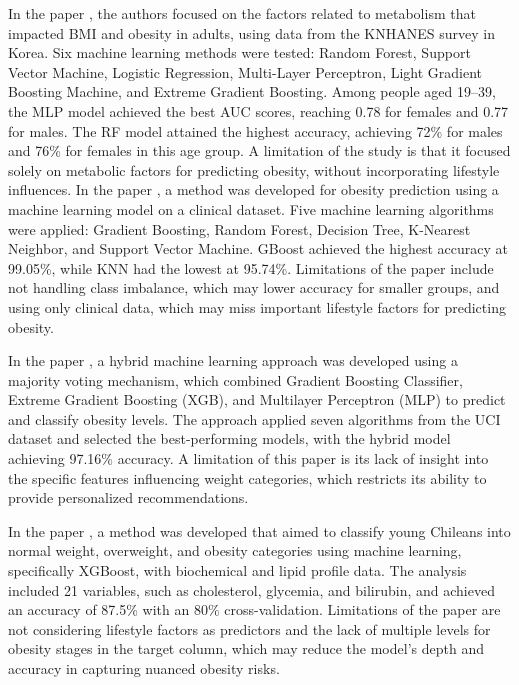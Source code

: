 In the paper \cite{Islam2022}, the authors focused on the factors related to metabolism that impacted BMI and obesity in adults, using data from the KNHANES survey in Korea. Six machine learning methods were tested: Random Forest, Support Vector Machine, Logistic Regression, Multi-Layer Perceptron, Light Gradient Boosting Machine, and Extreme Gradient Boosting. Among people aged 19–39, the MLP model achieved the best AUC scores, reaching 0.78 for females and 0.77 for males. The RF model attained the highest accuracy, achieving 72\% for males and 76\% for females in this age group. A limitation of the study is that it focused solely on metabolic factors for predicting obesity, without incorporating lifestyle influences. 
In the paper \cite{Sharma2023}, a method was developed for obesity prediction using a machine learning model on a clinical dataset. Five machine learning algorithms were applied: Gradient Boosting, Random Forest, Decision Tree, K-Nearest Neighbor, and Support Vector Machine. GBoost achieved the highest accuracy at 99.05\%, while KNN had the lowest at 95.74\%. Limitations of the paper include not handling class imbalance, which may lower accuracy for smaller groups, and using only clinical data, which may miss important lifestyle factors for predicting obesity. 

In the paper \cite{Raja2023}, a hybrid machine learning approach was developed using a majority voting mechanism, which combined Gradient Boosting Classifier, Extreme Gradient Boosting (XGB), and Multilayer Perceptron (MLP) to predict and classify obesity levels. The approach applied seven algorithms from the UCI dataset and selected the best-performing models, with the hybrid model achieving 97.16\% accuracy. A limitation of this paper is its lack of insight into the specific features influencing weight categories, which restricts its ability to provide personalized recommendations. 

In the paper \cite{Jahan2023}, a method was developed that aimed to classify young Chileans into normal weight, overweight, and obesity categories using machine learning, specifically XGBoost, with biochemical and lipid profile data. The analysis included 21 variables, such as cholesterol, glycemia, and bilirubin, and achieved an accuracy of 87.5\% with an 80\% cross-validation. Limitations of the paper are not considering lifestyle factors as predictors and the lack of multiple levels for obesity stages in the target column, which may reduce the model's depth and accuracy in capturing nuanced obesity risks. 

